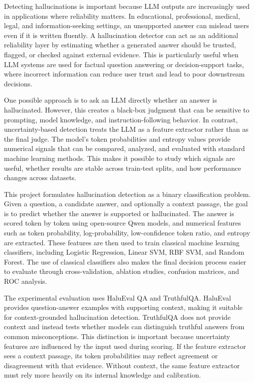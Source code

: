 \documentclass[11pt]{article}
\begin{document}
Detecting hallucinations is important because LLM outputs are increasingly used in applications where reliability matters. In educational, professional, medical, legal, and information-seeking settings, an unsupported answer can mislead users even if it is written fluently. A hallucination detector can act as an additional reliability layer by estimating whether a generated answer should be trusted, flagged, or checked against external evidence. This is particularly useful when LLM systems are used for factual question answering or decision-support tasks, where incorrect information can reduce user trust and lead to poor downstream decisions.

One possible approach is to ask an LLM directly whether an answer is hallucinated. However, this creates a black-box judgment that can be sensitive to prompting, model knowledge, and instruction-following behavior. In contrast, uncertainty-based detection treats the LLM as a feature extractor rather than as the final judge. The model's token probabilities and entropy values provide numerical signals that can be compared, analyzed, and evaluated with standard machine learning methods. This makes it possible to study which signals are useful, whether results are stable across train-test splits, and how performance changes across datasets.

This project formulates hallucination detection as a binary classification problem. Given a question, a candidate answer, and optionally a context passage, the goal is to predict whether the answer is supported or hallucinated. The answer is scored token by token using open-source Qwen models, and numerical features such as token probability, log-probability, low-confidence token ratio, and entropy are extracted. These features are then used to train classical machine learning classifiers, including Logistic Regression, Linear SVM, RBF SVM, and Random Forest. The use of classical classifiers also makes the final decision process easier to evaluate through cross-validation, ablation studies, confusion matrices, and ROC analysis.

The experimental evaluation uses HaluEval QA and TruthfulQA. HaluEval provides question-answer examples with supporting context, making it suitable for context-grounded hallucination detection. TruthfulQA does not provide context and instead tests whether models can distinguish truthful answers from common misconceptions. This distinction is important because uncertainty features are influenced by the input used during scoring. If the feature extractor sees a context passage, its token probabilities may reflect agreement or disagreement with that evidence. Without context, the same feature extractor must rely more heavily on its internal knowledge and calibration.
\end{document}
